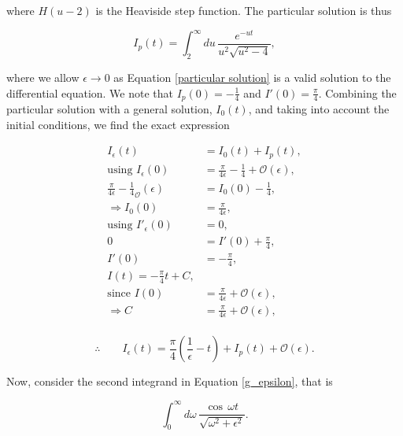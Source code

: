\documentclass{article}
\numberwithin{equation}{section} %
\begin{document}
\noindent where $H(u-2)$ is the Heaviside step function. The particular solution is thus 

\begin{equation}
I_p(t) = \int^\infty_2 du \, \frac{e^{-ut}}{u^2\sqrt{u^2-4}},
\label{particular solution}
\end{equation}

\noindent where we allow $\epsilon\rightarrow 0$ as Equation \ref{particular solution} is a valid solution to the differential equation. We note that $I_p(0) = -\frac{1}{4}$ and $I'(0) = \frac{\pi}{4}$. Combining the particular solution with a general solution, $I_0(t)$, and taking into account the initial conditions, we find the exact expression

\begin{equation}
\begin{split}
I_\epsilon(t) &= I_0(t) + I_p(t),\\
\mathrm{using \,} \,I_\epsilon(0) &= \frac{\pi}{4\epsilon} - \frac{1}{4} + \mathcal{O}(\epsilon),\\ 
\frac{\pi}{4\epsilon} - \frac{1}{4} _ \mathcal{O}(\epsilon) & = I_0(0)  -\frac{1}{4},\\
\Rightarrow I_0(0)&= \frac{\pi}{4\epsilon},\\
\mathrm{using \,} \,I'_\epsilon(0) &= 0,\\ 
0 &= I'(0) + \frac{\pi}{4},\\
I'(0) &= -\frac{\pi}{4},\\
I(t) = -\frac{\pi}{4}t + C,\\
\mathrm{since\,}\, I(0) &= \frac{\pi}{4\epsilon}+\mathcal{O}(\epsilon),\\
\Rightarrow C &=\frac{\pi}{4\epsilon}+\mathcal{O}(\epsilon),\\
\end{split}
\end{equation}

\begin{equation}
\therefore \quad \quad I_\epsilon(t) = \frac{\pi}{4}(\frac{1}{\epsilon}-t) + I_p(t) +\mathcal{O}(\epsilon).
\label{I full solution}
\end{equation}

Now, consider the second integrand in Equation \ref{g_epsilon}, that is

\begin{equation}
\int^\infty_0 d\omega\, \frac{\cos \, \omega t}{\sqrt{\omega^2+\epsilon^2}}.
\label{second term}
\end{equation}
\end{document}
